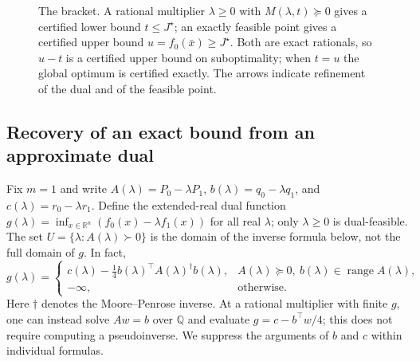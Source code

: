 \documentclass[11pt]{article}
\newcommand{\R}{\mathbb{R}}
\newcommand{\Q}{\mathbb{Q}}
\theoremstyle{plain}
\theoremstyle{remark}
\begin{document}
\begin{figure}[t]
\centering
{}
\caption{The bracket. A rational multiplier $\lambda\ge0$ with $M(\lambda,t)\succeq0$ gives a
certified lower bound $t\le J^\star$; an exactly feasible point gives a certified
upper bound $u=f_0(\bar x)\ge J^\star$. Both are exact rationals, so $u-t$ is a
certified upper bound on suboptimality; when $t=u$ the global optimum is certified exactly. The
arrows indicate refinement of the dual and of the feasible point.}
\label{fig:bracket}
\end{figure}

\subsection{Recovery of an exact bound from an approximate dual}

Fix $m=1$ and write $A(\lambda)=P_0-\lambda P_1$,
$b(\lambda)=q_0-\lambda q_1$, and $c(\lambda)=r_0-\lambda r_1$.
Define the extended-real dual function
$g(\lambda)=\inf_{x\in\R^n}(f_0(x)-\lambda f_1(x))$ for all real $\lambda$;
only $\lambda\ge0$ is dual-feasible. The set
$U=\{\lambda:A(\lambda)\succ0\}$ is the domain of the inverse formula below,
not the full domain of $g$. In fact,
\[
g(\lambda)=\begin{cases}
c(\lambda)-\tfrac14 b(\lambda)^\top A(\lambda)^\dagger b(\lambda),
 & A(\lambda)\succeq0,\ b(\lambda)\in\operatorname{range}A(\lambda),\\
-\infty, & \text{otherwise}.
\end{cases}
\]
Here $\dagger$ denotes the Moore--Penrose inverse. At a rational multiplier
with finite $g$, one can instead solve $Aw=b$ over $\Q$ and evaluate
$g=c-b^\top w/4$; this does not require computing a pseudoinverse.
We suppress the arguments of $b$ and $c$ within individual formulas.
\end{document}
